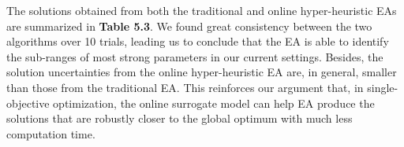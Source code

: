 The solutions obtained from both the traditional and online hyper-heuristic EAs are summarized in \textbf{Table 5.3}. We found great consistency between the two algorithms over 10 trials, leading us to conclude that the EA is able to identify the sub-ranges of most strong parameters in our current settings. Besides, the solution uncertainties from the online hyper-heuristic EA are, in general, smaller than those from the traditional EA. This reinforces our argument that, in single-objective optimization, the online surrogate model can help EA produce the solutions that are robustly closer to the global optimum with much less computation time.

\begin{table}[]
\footnotesize
\begin{center}
\caption{Calibration results over the 10 trials of EA-based optimization.}
\end{center}
\end{table}

